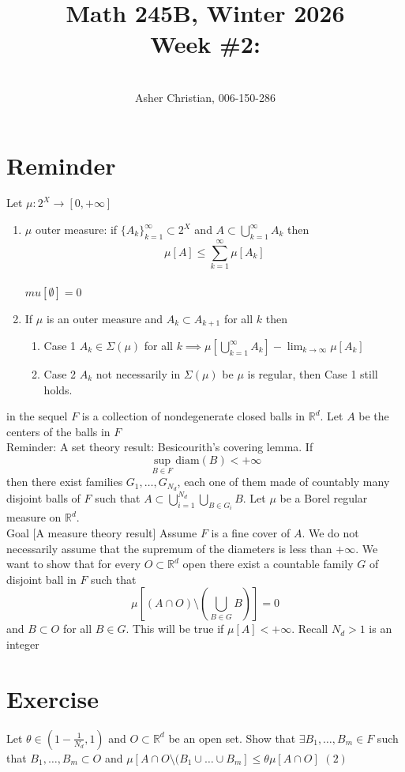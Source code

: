 \documentclass[11pt]{article}
\newcommand{\cnum}{Math 245B}
\newcommand{\ced}{Winter 2026}
\newcommand{\ctitle}[4]{\title{\vspace{-0.5in}\cnum, \ced\\Week #1: #2}\author{\vspace{-0.35in}\\#3, #4}}
\begin{document}
\ctitle{\#2}{}{Asher Christian}{006-150-286}
\date{}
\maketitle

\section{Reminder}
Let $\mu: 2^{X} \rightarrow [0,+\infty]$
\begin{enumerate}
    \item $ \mu $ outer measure: if $\{A_k\}_{k=1}^{\infty} \subset 2^{X}$ and $A \subset \bigcup_{k=1}^{\infty}A_k$ then
        \[
            \mu[A] \le \sum_{k=1}^{\infty}\mu[A_k]
        \] 
        \\$mu[\emptyset] = 0$ 
    \item If $\mu$ is an outer measure and $A_k \subset A_{k+1}$ for all $k$ then
        \begin{enumerate}
            \item Case 1 $A_k \in \Sigma(\mu)$ for all $k \implies \mu[\bigcup_{k=1}^{\infty}A_k] - \lim_{k\to \infty}\mu[A_k]$
            \item Case 2 $A_k$ not necessarily in  $\Sigma(\mu)$ be $\mu$ is regular, then Case 1 still holds.
        \end{enumerate}
\end{enumerate}
in the sequel $F$ is a collection of nondegenerate closed balls in  $ \mathbb{R}^{d}$. 
Let $A$ be the centers of the balls in  $F$
\\
Reminder: A set theory result: Besicourith's covering lemma. If
\[
    \sup_{B \in F} \text{diam}(B) < +\infty
\] 
then there exist families $G_1,\dots,G_{N_d}$, each one of them made of countably
many disjoint balls of $F$ such that  $A \subset \bigcup_{i=1}^{N_d} \bigcup_{B \in G_i} B$.
Let $\mu$ be a Borel regular measure on $ \mathbb{R}^{d}$.\\
Goal [A measure theory result] Assume $F$ is a fine cover of $A$. We do not necessarily assume
that the supremum of the diameters is less than $+\infty$. We want to show that for every $ O \subset \mathbb{R}^{d}$ open there exist
a countable family $G$ of disjoint ball in $F$ such that
\[
    \mu[(A \cap O) \setminus (\bigcup_{B \in G}B)] = 0
\] 
and $B \subset O$ for all $ B \in G$.
This will be true if  $\mu[A] < +\infty$.
Recall $N_d > 1$ is an integer
\section{Exercise}
Let  $\theta \in (1-\frac{1}{N_d}, 1)$ and $O \subset \mathbb{R}^{d}$ be an open set. Show that
$\exists B_1,\dots,B_m \in F$ such that $B_1,\dots,B_m \subset O$ and $\mu[A \cap O \setminus (B_1\cup\dots\cup B_m] \le \theta \mu[A \cap O]$ $(2)$
\end{document}
